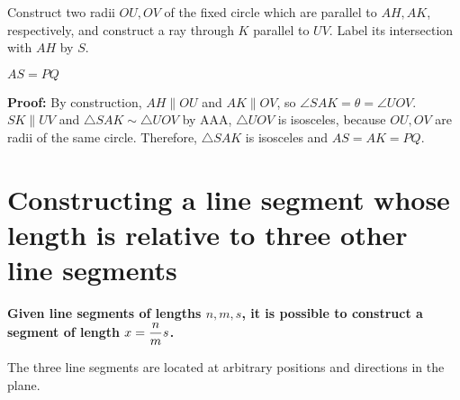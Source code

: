 \vspace{-2ex}

Construct two radii $OU,OV$ of the fixed circle which are parallel to $AH,AK$, respectively, and construct a ray through $K$ parallel to $UV$. Label its intersection with $AH$ by $S$. 

\textbf{$AS=PQ$}

\textbf{Proof:} By construction, $AH\|OU$ and $AK\|OV$, so $\angle SAK=\theta=\angle UOV$. $SK\|UV$ and $\triangle SAK\sim\triangle UOV$ by AAA, $\triangle UOV$ is isosceles, because $OU,OV$ are radii of the same circle. Therefore, $\triangle SAK$ is isosceles and $AS=AK=PQ$.

\section{Constructing a line segment whose length is relative to three other line segments}\label{s.relative}

\textbf{Given line segments of lengths $n, m, s$, it is possible to construct a segment of length $x=\displaystyle\frac{n}{m}s$.}

The three line segments are located at arbitrary positions and directions in the plane.

\begin{center}
\end{center}

